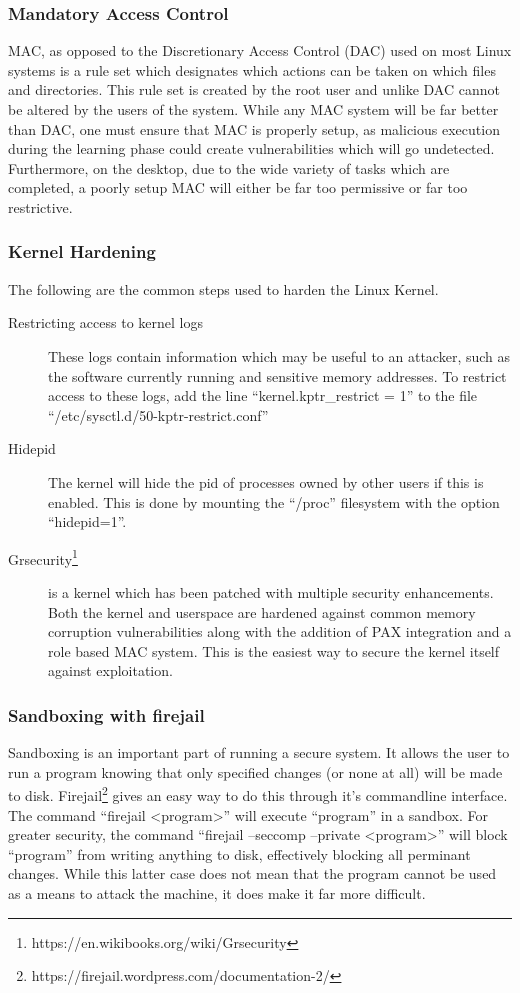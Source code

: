 \documentclass[a4paper,11pt]{report}
\begin{document}
			\subsubsection{Mandatory Access Control}
				MAC, as opposed to the Discretionary Access Control (DAC) used on most Linux systems is a rule set which designates which actions can be taken on which files and directories. 
				This rule set is created by the root user and unlike DAC cannot be altered by the users of the system. 
				While any MAC system will be far better than DAC, one must ensure that MAC is properly setup, as malicious execution during the learning phase could create vulnerabilities which will go undetected. 
				Furthermore, on the desktop, due to the wide variety of tasks which are completed, a poorly setup MAC will either be far too permissive or far too restrictive. 
			\subsubsection{Kernel Hardening}
				The following are the common steps used to harden the Linux Kernel. 
				\begin{description}
					\item[Restricting access to kernel logs]
						These logs contain information which may be useful to an attacker, such as the software currently running and sensitive memory addresses. 
						To restrict access to these logs, add the line ``kernel.kptr\_restrict = 1'' to the file ``/etc/sysctl.d/50-kptr-restrict.conf''
					\item[Hidepid] 
						The kernel will hide the pid of processes owned by other users if this is enabled. This is done by mounting the ``/proc'' filesystem with the option ``hidepid=1''. 
					\item[Grsecurity\footnote{https://en.wikibooks.org/wiki/Grsecurity}]
						is a kernel which has been patched with multiple security enhancements. 
						Both the kernel and userspace are hardened against common memory corruption vulnerabilities along with the addition of PAX integration and a role based MAC system. This is the easiest way to secure the kernel itself against exploitation. 
				\end{description}
				\subsubsection{Sandboxing with firejail}
					Sandboxing is an important part of running a secure system. 
					It allows the user to run a program knowing that only specified changes (or none at all) will be made to disk. 
					Firejail\footnote{https://firejail.wordpress.com/documentation-2/} gives an easy way to do this through it's commandline interface. 
					The command ``firejail <program>'' will execute ``program'' in a sandbox. 
					For greater security, the command ``firejail --seccomp --private <program>'' will block ``program'' from writing anything to disk, effectively blocking all perminant changes. 
					While this latter case does not mean that the program cannot be used as a means to attack the machine, it does make it far more difficult. 
\end{document}
